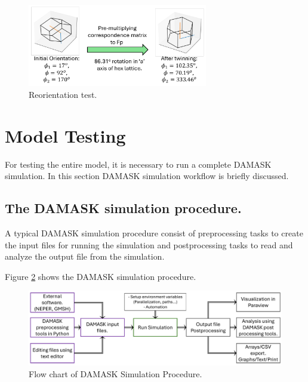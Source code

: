  \begin{figure}[H]
    \centering
    \includegraphics[width=0.7\textwidth]{images/Reorientation_Test.pdf}
    \caption{Reorientation test.}
    \label{Reorientation_test}
 \end{figure}

\section{Model Testing}

For testing the entire model, it is necessary to run a complete DAMASK simulation. In this section DAMASK simulation workflow is briefly discussed.

\subsection{The DAMASK simulation procedure.}

A typical DAMASK simulation procedure consist of preprocessing tasks to create the input files for running the simulation and postprocessing tasks to read and analyze the output file from the simulation.

Figure \ref{DAMASK_workflow} shows the DAMASK simulation procedure.

\begin{figure}[H]
    \centering
    \includegraphics[width=\textwidth]{images/DAMASK_workflow.pdf}
    \caption{Flow chart of DAMASK Simulation Procedure.}
    \label{DAMASK_workflow}
\end{figure}

